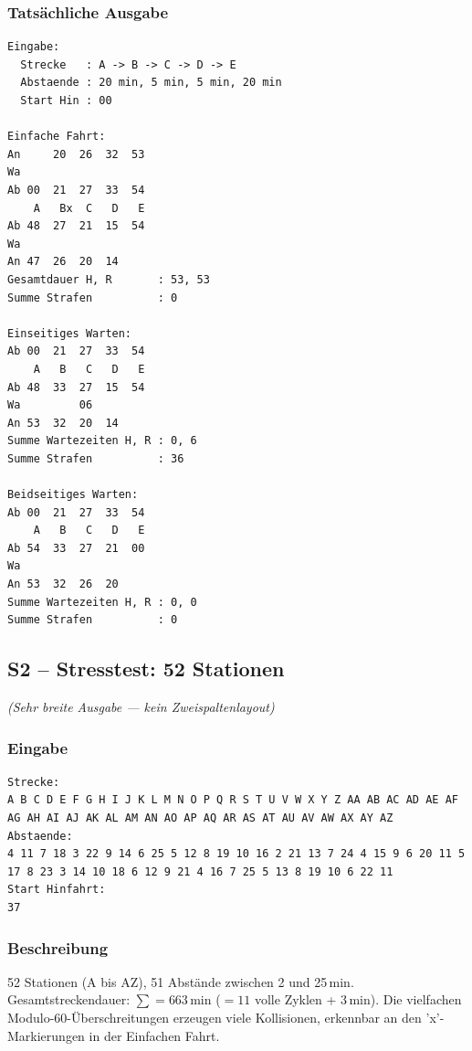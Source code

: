 \documentclass[12pt,a4paper]{article}
\begin{document}
\begin{minipage}[t]{0.48\textwidth}
\scriptsize
\subsubsection*{Tatsächliche Ausgabe}
\begin{lstlisting}
Eingabe:
  Strecke   : A -> B -> C -> D -> E
  Abstaende : 20 min, 5 min, 5 min, 20 min
  Start Hin : 00

Einfache Fahrt:
An     20  26  32  53
Wa
Ab 00  21  27  33  54
    A   Bx  C   D   E
Ab 48  27  21  15  54
Wa
An 47  26  20  14
Gesamtdauer H, R       : 53, 53
Summe Strafen          : 0

Einseitiges Warten:
Ab 00  21  27  33  54
    A   B   C   D   E
Ab 48  33  27  15  54
Wa         06
An 53  32  20  14
Summe Wartezeiten H, R : 0, 6
Summe Strafen          : 36

Beidseitiges Warten:
Ab 00  21  27  33  54
    A   B   C   D   E
Ab 54  33  27  21  00
Wa
An 53  32  26  20
Summe Wartezeiten H, R : 0, 0
Summe Strafen          : 0
\end{lstlisting}
\end{minipage}

\subsection{S2 – Stresstest: 52 Stationen}
\label{test:s2}
\textit{(Sehr breite Ausgabe — kein Zweispaltenlayout)}

\subsubsection*{Eingabe}
\begin{lstlisting}
Strecke:
A B C D E F G H I J K L M N O P Q R S T U V W X Y Z AA AB AC AD AE AF AG AH AI AJ AK AL AM AN AO AP AQ AR AS AT AU AV AW AX AY AZ
Abstaende:
4 11 7 18 3 22 9 14 6 25 5 12 8 19 10 16 2 21 13 7 24 4 15 9 6 20 11 5 17 8 23 3 14 10 18 6 12 9 21 4 16 7 25 5 13 8 19 10 6 22 11
Start Hinfahrt:
37
\end{lstlisting}

\subsubsection*{Beschreibung}
52 Stationen (A bis AZ), 51 Abstände zwischen 2 und 25\,min.
Gesamtstreckendauer: $\sum = 663$\,min ($= 11$ volle Zyklen + 3\,min).
Die vielfachen Modulo-60-Überschreitungen erzeugen viele Kollisionen,
erkennbar an den 'x'-Markierungen in der Einfachen Fahrt.
\end{document}
